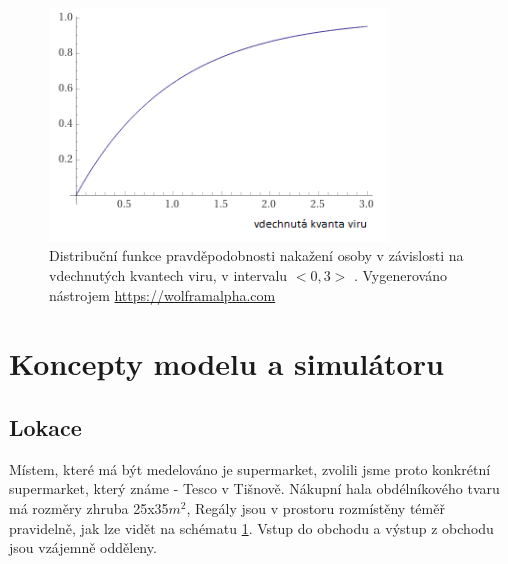 \documentclass[11pt,a4paper]{article}
\begin{document}
\begin{figure}[h!]
  \caption{Distribuční funkce pravděpodobnosti nakažení osoby v závislosti na vdechnutých kvantech viru, v intervalu $<0,3>$ . Vygenerováno nástrojem \href{https://wolframalpha.com}{https://wolframalpha.com}}
  \label{figtes}
  \begin{center}
    \includegraphics[width=0.8\textwidth]{exp.png}
    \end{center}
\end{figure}    

\section{Koncepty modelu a simulátoru}
\subsection{Lokace}
Místem, které má být medelováno je supermarket, zvolili jsme proto konkrétní supermarket, který známe - Tesco v Tišnově. Nákupní hala obdélníkového tvaru má rozměry zhruba 25x35$m^{2}$,
Regály jsou v prostoru rozmístěny téměř pravidelně, jak lze vidět na schématu \ref{figtes}. Vstup do obchodu a výstup z obchodu jsou vzájemně odděleny.
\end{document}
